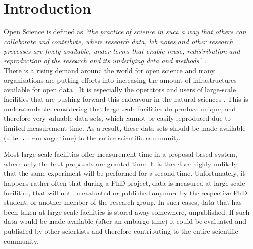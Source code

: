 \documentclass[aps,pra,reprint,amsmath,amssymb,superscriptaddress,showkeys]{revtex4-1}
\begin{document}
\maketitle



\section{Introduction}

Open Science is defined as \emph{``the practice of science in such a way that others can collaborate and contribute, where research data, lab notes and other research processes are freely available, under terms that enable reuse, redistribution and reproduction of the research and its underlying data and methods''} \cite{foster}.\\

There is a rising demand around the world for open science and many organisations are putting efforts into increasing the amount of infrastructures available for open data \cite{plos, sharing, panosc, nfdi, expands}. 
It is especially the operators and users of large-scale facilities that are pushing forward this endeavour in the natural sciences \cite{panosc, nfdi, expands}.
This is understandable, considering that large-scale facilities do produce unique, and therefore very valuable data sets, which cannot be easily reproduced due to limited measurement time. As a result, these data sets should be made available (after an embargo time) to the entire scientific community. 

Most large-scale facilities offer measurement time in a proposal based system, where only the best proposals are granted time.
It is therefore highly unlikely that the same experiment will be performed for a second time. 
Unfortunately, it happens rather often that during a PhD project, data is measured at large-scale facilities, that will not be evaluated or published anymore by the respective PhD student, or another member of the research group.
In such cases, data that has been taken at large-scale facilities is stored away somewhere, unpublished.
If such data would be made available (after an embargo time) it could be evaluated and published by other scientists and therefore contributing to the entire scientific community.
\end{document}
